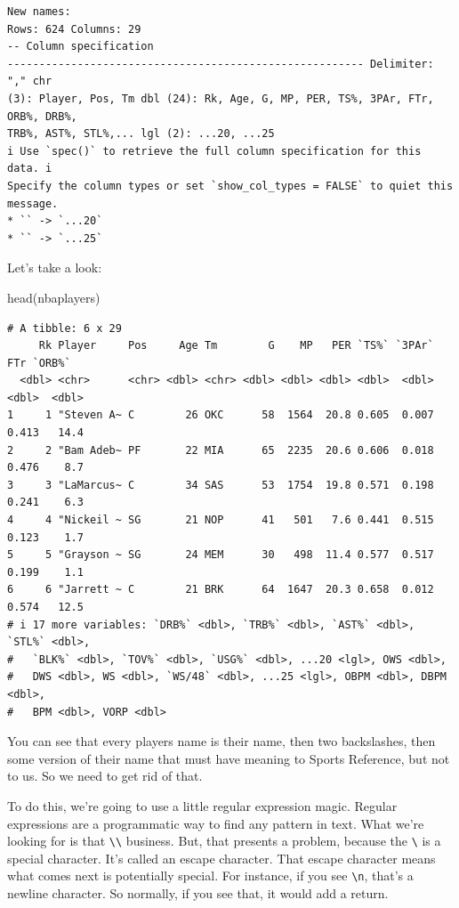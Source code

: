 \documentclass[
  letterpaper,
  DIV=11,
  numbers=noendperiod]{scrreprt}
\newenvironment{Shaded}{\begin{snugshade}}{\end{snugshade}}
\newcommand{\FunctionTok}[1]{\textcolor[rgb]{0.28,0.35,0.67}{#1}}
\newcommand{\NormalTok}[1]{\textcolor[rgb]{0.00,0.23,0.31}{#1}}
\begin{document}
\begin{verbatim}
New names:
Rows: 624 Columns: 29
-- Column specification
-------------------------------------------------------- Delimiter: "," chr
(3): Player, Pos, Tm dbl (24): Rk, Age, G, MP, PER, TS%, 3PAr, FTr, ORB%, DRB%,
TRB%, AST%, STL%,... lgl (2): ...20, ...25
i Use `spec()` to retrieve the full column specification for this data. i
Specify the column types or set `show_col_types = FALSE` to quiet this message.
* `` -> `...20`
* `` -> `...25`
\end{verbatim}

Let's take a look:

\begin{Shaded}
\begin{Highlighting}[]
\FunctionTok{head}\NormalTok{(nbaplayers)}
\end{Highlighting}
\end{Shaded}

\begin{verbatim}
# A tibble: 6 x 29
     Rk Player     Pos     Age Tm        G    MP   PER `TS%` `3PAr`   FTr `ORB%`
  <dbl> <chr>      <chr> <dbl> <chr> <dbl> <dbl> <dbl> <dbl>  <dbl> <dbl>  <dbl>
1     1 "Steven A~ C        26 OKC      58  1564  20.8 0.605  0.007 0.413   14.4
2     2 "Bam Adeb~ PF       22 MIA      65  2235  20.6 0.606  0.018 0.476    8.7
3     3 "LaMarcus~ C        34 SAS      53  1754  19.8 0.571  0.198 0.241    6.3
4     4 "Nickeil ~ SG       21 NOP      41   501   7.6 0.441  0.515 0.123    1.7
5     5 "Grayson ~ SG       24 MEM      30   498  11.4 0.577  0.517 0.199    1.1
6     6 "Jarrett ~ C        21 BRK      64  1647  20.3 0.658  0.012 0.574   12.5
# i 17 more variables: `DRB%` <dbl>, `TRB%` <dbl>, `AST%` <dbl>, `STL%` <dbl>,
#   `BLK%` <dbl>, `TOV%` <dbl>, `USG%` <dbl>, ...20 <lgl>, OWS <dbl>,
#   DWS <dbl>, WS <dbl>, `WS/48` <dbl>, ...25 <lgl>, OBPM <dbl>, DBPM <dbl>,
#   BPM <dbl>, VORP <dbl>
\end{verbatim}

You can see that every players name is their name, then two backslashes,
then some version of their name that must have meaning to Sports
Reference, but not to us. So we need to get rid of that.

To do this, we're going to use a little regular expression magic.
Regular expressions are a programmatic way to find any pattern in text.
What we're looking for is that \texttt{\textbackslash{}\textbackslash{}}
business. But, that presents a problem, because the
\texttt{\textbackslash{}} is a special character. It's called an escape
character. That escape character means what comes next is potentially
special. For instance, if you see \texttt{\textbackslash{}n}, that's a
newline character. So normally, if you see that, it would add a return.
\end{document}
